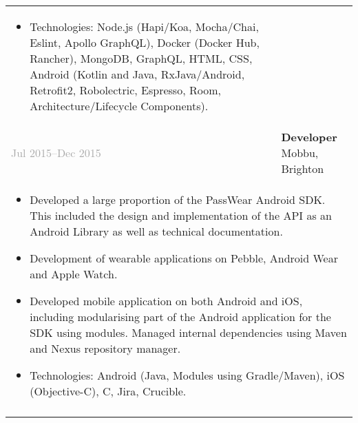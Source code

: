 \documentclass{article}
\newenvironment{exptable}{
  \begin{longtable}{lp{0.8\textwidth}}
  }{
  \end{longtable}
}
\begin{document}
\begin{exptable}
{        \begin{itemize}[leftmargin=1em]
          \item[] Technologies: Node.js (Hapi/Koa, Mocha/Chai, Eslint, Apollo GraphQL), Docker (Docker Hub, Rancher), MongoDB, GraphQL, HTML, CSS, Android (Kotlin and Java, RxJava/Android, Retrofit2, Robolectric, Espresso, Room, Architecture/Lifecycle Components).
        \end{itemize}
      } \\
      \textcolor{darkgray}{Jul 2015--Dec 2015} & \textbf{Developer} Mobbu, Brighton \\
      \multicolumn{2}{p{\textwidth}}{
        \begin{itemize}
          \item Developed a large proportion of the PassWear Android SDK. This included the design and implementation of the API as an Android Library as well as technical documentation.
          \item Development of wearable applications on Pebble, Android Wear and Apple Watch.
          \item Developed mobile application on both Android and iOS, including modularising part of the Android application for the SDK using modules. Managed internal dependencies using Maven and Nexus repository manager.
        \end{itemize}

        \vspace{1em}

        \begin{itemize}[leftmargin=1em]
          \item[] Technologies: Android (Java, Modules using Gradle/Maven), iOS (Objective-C), C, Jira, Crucible.
        \end{itemize}
      } \\

      \clearpage


\end{exptable}
\end{document}
